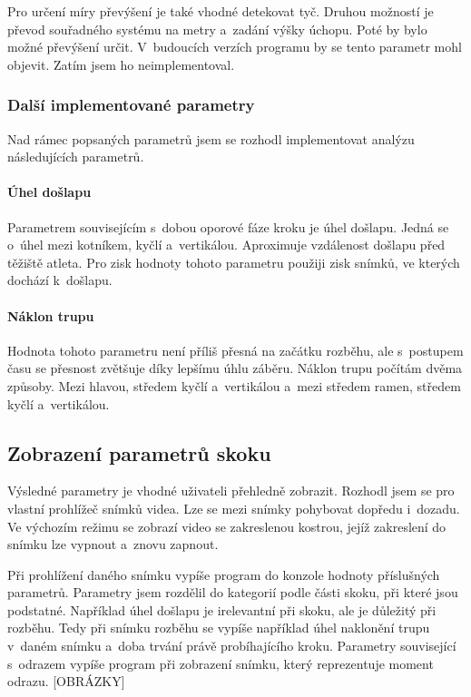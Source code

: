 Pro určení míry převýšení je také vhodné detekovat tyč. Druhou možností je převod souřadného systému na metry a~zadání výšky úchopu. Poté by bylo možné převýšení určit. V~budoucích verzích programu by se tento parametr mohl objevit. Zatím jsem ho neimplementoval.

\subsubsection{Další implementované parametry}

Nad rámec popsaných parametrů jsem se rozhodl implementovat analýzu následujících parametrů.

\paragraph{Úhel došlapu}

Parametrem souvisejícím s~dobou oporové fáze kroku je úhel došlapu. Jedná se o~úhel mezi kotníkem, kyčlí a~vertikálou. Aproximuje vzdálenost došlapu před těžiště atleta. Pro zisk hodnoty tohoto parametru použiji zisk snímků, ve kterých dochází k~došlapu.

\paragraph{Náklon trupu}

Hodnota tohoto parametru není příliš přesná na začátku rozběhu, ale s~postupem času se přesnost zvětšuje díky lepšímu úhlu záběru. Náklon trupu počítám dvěma způsoby. Mezi hlavou, středem kyčlí a~vertikálou a~mezi středem ramen, středem kyčlí a~vertikálou.

\subsection{Zobrazení parametrů skoku}

Výsledné parametry je vhodné uživateli přehledně zobrazit. Rozhodl jsem se pro vlastní prohlížeč snímků videa. Lze se mezi snímky pohybovat dopředu i~dozadu. Ve výchozím režimu se zobrazí video se zakreslenou kostrou, jejíž zakreslení do snímku lze vypnout a~znovu zapnout.

Při prohlížení daného snímku vypíše program do konzole hodnoty příslušných parametrů. Parametry jsem rozdělil do kategorií podle části skoku, při které jsou podstatné. Například úhel došlapu je irelevantní při skoku, ale je důležitý při rozběhu. Tedy při snímku rozběhu se vypíše například úhel naklonění trupu v~daném snímku a~doba trvání právě probíhajícího kroku. Parametry související s~odrazem vypíše program při zobrazení snímku, který reprezentuje moment odrazu. [OBRÁZKY]

